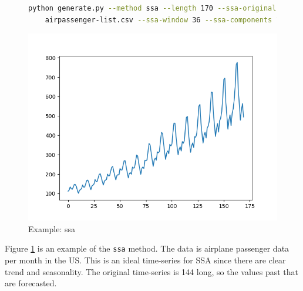 \begin{figure}
\begin{lstlisting}[language=bash]
    python generate.py --method ssa --length 170 --ssa-original \
    airpassenger-list.csv --ssa-window 36 --ssa-components 13 --display
\end{lstlisting}
\includegraphics[scale=0.7]{figures/ssa}
\caption{Example: ssa}    
\label{fig:ssa-example}
\end{figure}

Figure \ref{fig:ssa-example} is an example of the \texttt{ssa} method. The data is airplane passenger data per month in the US. This is an ideal time-series for SSA since there are clear trend and seasonality. The original time-series is 144 long, so the values past that are forecasted.